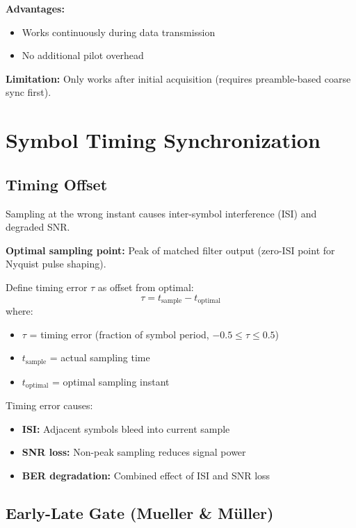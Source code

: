 \textbf{Advantages:}
\begin{itemize}
\item[\checkmark] Works continuously during data transmission
\item[\checkmark] No additional pilot overhead
\end{itemize}

\textbf{Limitation:} Only works after initial acquisition (requires preamble-based coarse sync first).

\section{Symbol Timing Synchronization}

\subsection{Timing Offset}

Sampling at the wrong instant causes inter-symbol interference (ISI) and degraded SNR.

\textbf{Optimal sampling point:} Peak of matched filter output (zero-ISI point for Nyquist pulse shaping).

Define timing error $\tau$ as offset from optimal:
\begin{equation}
\tau = t_{\text{sample}} - t_{\text{optimal}}
\end{equation}
where:
\begin{itemize}
\item $\tau$ = timing error (fraction of symbol period, $-0.5 \leq \tau \leq 0.5$)
\item $t_{\text{sample}}$ = actual sampling time
\item $t_{\text{optimal}}$ = optimal sampling instant
\end{itemize}

Timing error causes:
\begin{itemize}
\item \textbf{ISI:} Adjacent symbols bleed into current sample
\item \textbf{SNR loss:} Non-peak sampling reduces signal power
\item \textbf{BER degradation:} Combined effect of ISI and SNR loss
\end{itemize}

\subsection{Early-Late Gate (Mueller \& Müller)}

